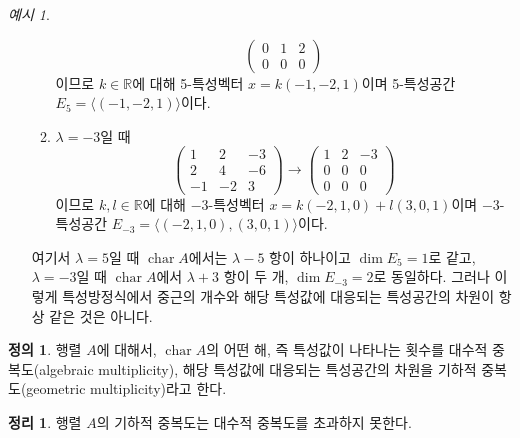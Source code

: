 \documentclass[unfonts,oneside,a4paper]{oblivoir}
\theoremstyle{definition}
\newtheorem{definition}{정의}[section]
\theoremstyle{theorem}
\newtheorem{theorem}{정리}[section]
\theoremstyle{theorem}
\theoremstyle{remark}
\theoremstyle{remark}
\theoremstyle{remark}
\newtheorem*{example}{예시}
\theoremstyle{remark}
\renewcommand{\vec}[1]{\bm{\mathit{#1}}}
\DeclareMathOperator{\Char}{char}
\begin{document}
\begin{example}
\begin{enumerate}
\begin{enumerate}
\begin{equation*}
\begin{pmatrix}
                            0 & 1 & 2\\
                            0 & 0 & 0
                        \end{pmatrix}
                    \end{equation*}
                    이므로 $k \in \mathbb R$에 대해 5-특성벡터 $\vec x = k(-1, -2, 1)$이며 5-특성공간 $E_5 = \langle (-1, -2, 1) \rangle$이다.
                \item $\lambda = -3$일 때
                    \begin{equation*}
                        \begin{pmatrix}
                            1 & 2 & -3\\
                            2 & 4 & -6\\
                            -1 & -2 & 3
                        \end{pmatrix}
                        \rightarrow
                        \begin{pmatrix}
                            1 & 2 & -3\\
                            0 & 0 & 0\\
                            0 & 0 & 0
                        \end{pmatrix}
                    \end{equation*}
                    이므로 $k, l \in \mathbb R$에 대해 $-3$-특성벡터 $\vec x = k(-2, 1, 0) + l(3, 0, 1)$이며 $-3$-특성공간 $E_{-3} = \langle (-2, 1, 0), (3, 0, 1)\rangle$이다.
            \end{enumerate}
            여기서 $\lambda = 5$일 때 $\Char A$에서는 $\lambda - 5$ 항이 하나이고 $\dim E_5 = 1$로 같고, $\lambda = -3$일 때 $\Char A$에서 $\lambda + 3$ 항이 두 개, $\dim E_{-3} = 2$로 동일하다.
            그러나 이렇게 특성방정식에서 중근의 개수와 해당 특성값에 대응되는 특성공간의 차원이 항상 같은 것은 아니다.
    \end{enumerate}
\end{example}

\begin{definition}
    행렬 $A$에 대해서, $\Char A$의 어떤 해, 즉 특성값이 나타나는 횟수를 대수적 중복도(algebraic multiplicity), 해당 특성값에 대응되는 특성공간의 차원을 기하적 중복도(geometric multiplicity)라고 한다.
\end{definition}

\begin{theorem}
    행렬 $A$의 기하적 중복도는 대수적 중복도를 초과하지 못한다.
\end{theorem}
\end{document}
